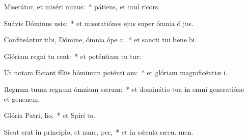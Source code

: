 \item Miserátor, et miséri minus:~* pátiens, et mul ricors.
\item Suávis Dóminus usis:~* et miseratiónes ejus super ómnia ó jus.
\item Confiteántur tibi, Dómine, ómnia ópe a:~* et sancti tui bene bi.
\item Glóriam regni tu cent:~* et poténtiam tu tur:
\item Ut notam fáciant fíliis hóminum poténti am:~* et glóriam magnificéntiæ  i.
\item Regnum tuum regnum ómnium særum:~* et dominátio tua in omni generatióne et genenem.
\item Glória Patri,  lio,~* et Spirí to.
\item Sicut erat in princípio, et nunc,  per,~* et in sǽcula sæcu. men.
